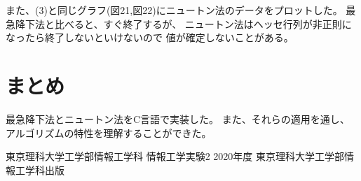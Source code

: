 \documentclass[12pt]{jarticle}
\begin{document}
\clearpage
また、(3)と同じグラフ(図21,図22)にニュートン法のデータをプロットした。
最急降下法と比べると、すぐ終了するが、
ニュートン法はヘッセ行列が非正則になったら終了しないといけないので
値が確定しないことがある。

\section{まとめ}
最急降下法とニュートン法をC言語で実装した。
また、それらの適用を通し、
アルゴリズムの特性を理解することができた。

\clearpage

\begin{thebibliography}{99}
    \label{sannkoubunnkenn_chapter}
    東京理科大学工学部情報工学科 情報工学実験2 2020年度
    東京理科大学工学部情報工学科出版

\end{thebibliography}


\clearpage

\appendix
\end{document}
